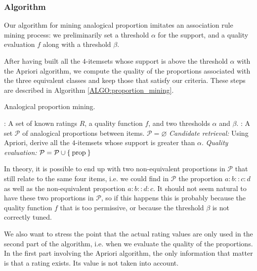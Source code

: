 \subsubsection{Algorithm}

Our algorithm for mining analogical proportion imitates an association rule
mining process: we preliminarily set a threshold $\alpha$ for the support, and a
quality evaluation $f$ along with a threshold $\beta$.

After having built all the $4$-itemsets whose support is above the threshold
$\alpha$ with the Apriori algorithm, we compute the quality of the proportions
associated with the three equivalent classes and keep those that satisfy our
criteria. These steps are described in Algorithm \ref{ALGO:proportion_mining}.

 \begin{algorithm}[!ht]
   \caption{Analogical proportion mining.}
       \label{ALGO:proportion_mining}
       \begin{algorithmic}

      : A set of known ratings $R$, a quality function $f$,
         and two thresholds $\alpha$ and $\beta$.
         : A set $\mathcal{P}$ of analogical proportions
         between items.
         \STATE $\mathcal{P} = \varnothing$
         \STATE \textit{Candidate retrieval:}
      \STATE Using Apriori, derive all the $4$-itemsets whose support is
         greater than $\alpha$.
         \STATE \textit{Quality evaluation:}
         \STATE $\mathcal{P} = \mathcal{P} \cup \Set{\text{prop}}$
         \ENDIF
         \ENDFOR
         \ENDFOR
\end{algorithmic}
\end{algorithm}

In theory, it is possible to end up with two non-equivalent proportions in
$\mathcal{P}$ that still relate to the same four items, i.e. we could find in
$\mathcal{P}$ the proportion $a:b::c:d$ as well as the non-equivalent
proportion $a:b::d:c$. It should not seem natural to have these two proportions
in $\mathcal{P}$, so if this happens this is probably because the quality
function $f$ that is too permissive, or because the threshold $\beta$ is not
correctly tuned.

We also want to stress the point that the actual rating values are only used in
the second part of the algorithm, i.e. when we evaluate the quality of the
proportions. In the first part involving the Apriori algorithm, the only
information that matter is that a rating exists. Its value is not taken into
account.

